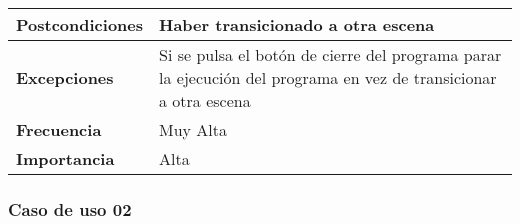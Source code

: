 \begin{longtable}{l|l}
\begin{minipage}{0.25\columnwidth}
\textbf{Postcondiciones} 
\end{minipage}
&
\begin{minipage}{0.65\columnwidth}
Haber transicionado a otra escena
\end{minipage}
\\ \hline

\begin{minipage}{0.25\columnwidth}
\textbf{Excepciones} 
\end{minipage}
&
\begin{minipage}{0.65\columnwidth}
Si se pulsa el botón de cierre del programa parar la ejecución del programa en vez de transicionar a otra escena
\end{minipage}
\\ \hline

\begin{minipage}{0.25\columnwidth}
\textbf{Frecuencia} 
\end{minipage}
&
\begin{minipage}{0.65\columnwidth}
Muy Alta
\end{minipage}
\\ \hline

\begin{minipage}{0.25\columnwidth}
\textbf{Importancia} 
\end{minipage}
&
\begin{minipage}{0.65\columnwidth}
Alta
\end{minipage}
\\ \hline
\end{longtable}

\subsubsection{Caso de uso 02}


